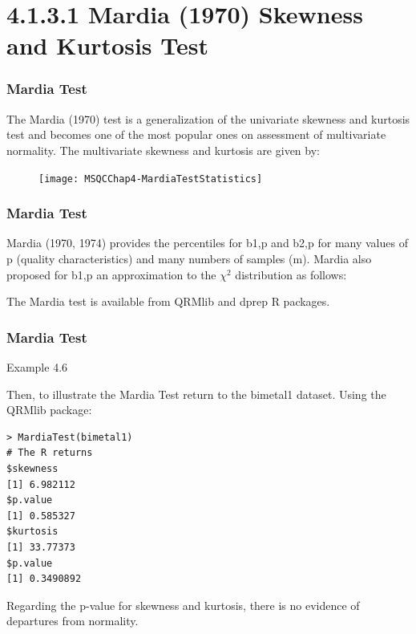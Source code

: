 \documentclass[]{beamer}
\begin{document}
\section{4.1.3.1 Mardia (1970) Skewness and Kurtosis Test}

\begin{frame}
\frametitle{Mardia Test}
\large
The Mardia (1970) test is a generalization of the univariate skewness and kurtosis
test and becomes one of the most popular ones on assessment of multivariate
normality. The multivariate skewness and kurtosis are given by:
\begin{figure}
\centering
\texttt{[image: MSQCChap4-MardiaTestStatistics]}
\caption{}
\label{fig:MSQCChap4-MardiaTestStatistics}
\end{figure}
\end{frame}


\begin{frame}
\frametitle{Mardia Test}
\large	
Mardia (1970, 1974) provides the percentiles for b1,p and b2,p for many values of
p (quality characteristics) and many numbers of samples (m).
Mardia also proposed for b1,p an approximation to the $\chi^2$ distribution as follows:

The Mardia test is available from QRMlib and dprep R packages.

\end{frame}
\begin{frame}[fragile]
	\frametitle{Mardia Test}
	\large
Example 4.6

Then, to illustrate the Mardia Test return to the bimetal1 dataset.
Using the QRMlib package:
\begin{verbatim}
> MardiaTest(bimetal1)
# The R returns
$skewness
[1] 6.982112
$p.value
[1] 0.585327
$kurtosis
[1] 33.77373
$p.value
[1] 0.3490892
\end{verbatim}
Regarding the p-value for skewness and kurtosis, there is no evidence of
departures from normality.
\end{frame}
\end{document}
